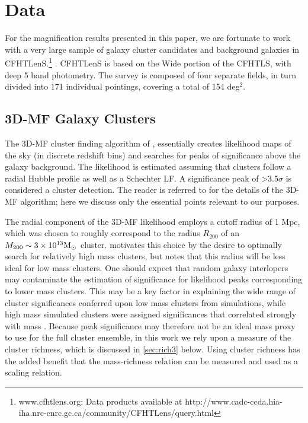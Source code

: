 
\section{Data}
\label{sec:data3}
For the magnification results presented in this paper, we are fortunate to work with a very large sample of galaxy cluster candidates and background galaxies in \ac{CFHTLenS}.\footnote{www.cfhtlens.org; Data products available at http://www.cadc-ccda.hia-iha.nrc-cnrc.gc.ca/\-community/\-CFHTLens/\-query.html} \citep{Erben13,Hildebrandt12}. \ac{CFHTLenS} is based on the Wide portion of the \acf{CFHTLS}, with deep 5 band photometry. The survey is composed of four separate fields, in turn divided into 171 individual pointings, covering a total of 154 deg$^2$.

\subsection{\ac{3D-MF} Galaxy Clusters}
\label{sec:clusters3}
The \ac{3D-MF} cluster finding algorithm of \citet{Milkeraitis10}, essentially creates likelihood maps of the sky (in discrete redshift bins) and searches for peaks of significance above the galaxy background. The likelihood is estimated assuming that clusters follow a radial Hubble profile as well as a Schechter \ac{LF}. A significance peak of \textgreater 3.5$\sigma$ is considered a cluster detection. The reader is referred to \citet{Milkeraitis10} for the details of the \ac{3D-MF} algorithm; here we discuss only the essential points relevant to our purposes. 

The radial component of the \ac{3D-MF} likelihood employs a cutoff radius of 1 Mpc, which was chosen to roughly correspond to the radius $R_{200}$ of an $M_{200} \sim 3 \times 10^{13} {\rm M}_{\odot}$ cluster. \citet{Milkeraitis10} motivates this choice by the desire to optimally search for relatively high mass clusters, but notes that this radius will be less ideal for low mass clusters. One should expect that random galaxy interlopers may contaminate the estimation of significance for likelihood peaks corresponding to lower mass clusters. This may be a key factor in explaining the wide range of cluster significances conferred upon low mass clusters from simulations, while high mass simulated clusters were assigned significances that correlated strongly with mass \citep[see figure 10 in][]{Milkeraitis10}. Because peak significance may therefore not be an ideal mass proxy to use for the full cluster ensemble, in this work we rely upon a measure of the cluster richness, which is discussed in \autoref{sec:rich3} below. Using cluster richness has the added benefit that the mass-richness relation can be measured and used as a scaling relation.

